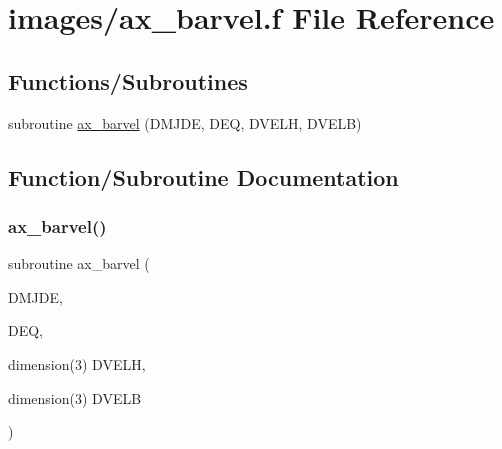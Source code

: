\hypertarget{ax__barvel_8f}{}\section{images/ax\+\_\+barvel.f File Reference}
\label{ax__barvel_8f}
\subsection*{Functions/\+Subroutines}
\begin{DoxyCompactItemize}
\item 
subroutine \hyperlink{ax__barvel_8f_a5bfa399560b5d762eacbc235086648d4}{ax\+\_\+barvel} (D\+M\+J\+DE, D\+EQ, D\+V\+E\+LH, D\+V\+E\+LB)
\end{DoxyCompactItemize}


\subsection{Function/\+Subroutine Documentation}
\mbox{\label{ax__barvel_8f_a5bfa399560b5d762eacbc235086648d4}} 
\subsubsection{\texorpdfstring{ax\+\_\+barvel()}{ax\_barvel()}}
{\footnotesize\ttfamily subroutine ax\+\_\+barvel (\begin{DoxyParamCaption}\item[{}]{D\+M\+J\+DE,  }\item[{}]{D\+EQ,  }\item[{dimension(3)}]{D\+V\+E\+LH,  }\item[{dimension(3)}]{D\+V\+E\+LB }\end{DoxyParamCaption})}

